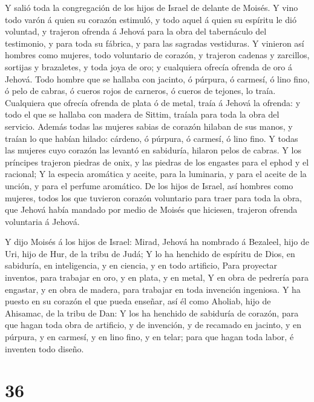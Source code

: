  Y salió toda la congregación de los hijos de Israel de
delante de Moisés.  Y vino todo varón á quien su corazón
estimuló, y todo aquel á quien su espíritu le dió voluntad, y trajeron
ofrenda á Jehová para la obra del tabernáculo del testimonio, y para
toda su fábrica, y para las sagradas vestiduras.  Y
vinieron así hombres como mujeres, todo voluntario de corazón, y
trajeron cadenas y zarcillos, sortijas y brazaletes, y toda joya de oro;
y cualquiera ofrecía ofrenda de oro á Jehová.  Todo hombre
que se hallaba con jacinto, ó púrpura, ó carmesí, ó lino fino, ó pelo de
cabras, ó cueros rojos de carneros, ó cueros de tejones, lo traía.
 Cualquiera que ofrecía ofrenda de plata ó de metal, traía
á Jehová la ofrenda: y todo el que se hallaba con madera de Sittim,
traíala para toda la obra del servicio.  Además todas las
mujeres sabias de corazón hilaban de sus manos, y traían lo que habían
hilado: cárdeno, ó púrpura, ó carmesí, ó lino fino.  Y
todas las mujeres cuyo corazón las levantó en sabiduría, hilaron pelos
de cabras.  Y los príncipes trajeron piedras de onix, y las
piedras de los engastes para el ephod y el racional;  Y la
especia aromática y aceite, para la luminaria, y para el aceite de la
unción, y para el perfume aromático.  De los hijos de
Israel, así hombres como mujeres, todos los que tuvieron corazón
voluntario para traer para toda la obra, que Jehová había mandado por
medio de Moisés que hiciesen, trajeron ofrenda voluntaria á Jehová.

 Y dijo Moisés á los hijos de Israel: Mirad, Jehová ha
nombrado á Bezaleel, hijo de Uri, hijo de Hur, de la tribu de Judá;
 Y lo ha henchido de espíritu de Dios, en sabiduría, en
inteligencia, y en ciencia, y en todo artificio,  Para
proyectar inventos, para trabajar en oro, y en plata, y en metal,
 Y en obra de pedrería para engastar, y en obra de madera,
para trabajar en toda invención ingeniosa.  Y ha puesto en
su corazón el que pueda enseñar, así él como Aholiab, hijo de Ahisamac,
de la tribu de Dan:  Y los ha henchido de sabiduría de
corazón, para que hagan toda obra de artificio, y de invención, y de
recamado en jacinto, y en púrpura, y en carmesí, y en lino fino, y en
telar; para que hagan toda labor, é inventen todo diseño.

\hypertarget{section-35}{%
\section{36}\label{section-35}}

